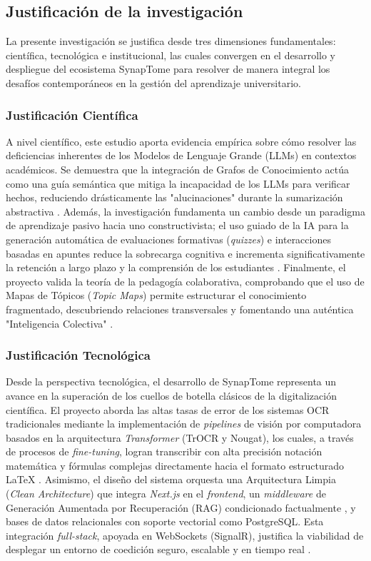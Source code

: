 \subsection{Justificación de la investigación}

La presente investigación se justifica desde tres dimensiones fundamentales: científica, tecnológica e institucional, las cuales convergen en el desarrollo y despliegue del ecosistema SynapTome para resolver de manera integral los desafíos contemporáneos en la gestión del aprendizaje universitario.

\subsubsection{Justificación Científica}
A nivel científico, este estudio aporta evidencia empírica sobre cómo resolver las deficiencias inherentes de los Modelos de Lenguaje Grande (LLMs) en contextos académicos. Se demuestra que la integración de Grafos de Conocimiento actúa como una guía semántica que mitiga la incapacidad de los LLMs para verificar hechos, reduciendo drásticamente las "alucinaciones" durante la sumarización abstractiva \parencite{Chen2023}. Además, la investigación fundamenta un cambio desde un paradigma de aprendizaje pasivo hacia uno constructivista; el uso guiado de la IA para la generación automática de evaluaciones formativas (\textit{quizzes}) e interacciones basadas en apuntes reduce la sobrecarga cognitiva e incrementa significativamente la retención a largo plazo y la comprensión de los estudiantes \parencite{Kreijkes2026, Afian2025}. Finalmente, el proyecto valida la teoría de la pedagogía colaborativa, comprobando que el uso de Mapas de Tópicos (\textit{Topic Maps}) permite estructurar el conocimiento fragmentado, descubriendo relaciones transversales y fomentando una auténtica "Inteligencia Colectiva" \parencite{Obionwu2022}.

\subsubsection{Justificación Tecnológica}
Desde la perspectiva tecnológica, el desarrollo de SynapTome representa un avance en la superación de los cuellos de botella clásicos de la digitalización científica. El proyecto aborda las altas tasas de error de los sistemas OCR tradicionales mediante la implementación de \textit{pipelines} de visión por computadora basados en la arquitectura \textit{Transformer} (TrOCR y Nougat), los cuales, a través de procesos de \textit{fine-tuning}, logran transcribir con alta precisión notación matemática y fórmulas complejas directamente hacia el formato estructurado \LaTeX{} \parencite{AlvarezPerez2026, KardanMoghaddam2025}. Asimismo, el diseño del sistema orquesta una Arquitectura Limpia (\textit{Clean Architecture}) que integra \textit{Next.js} en el \textit{frontend}, un \textit{middleware} de Generación Aumentada por Recuperación (RAG) condicionado factualmente \parencite{Ning2025, Jiang2025}, y bases de datos relacionales con soporte vectorial como PostgreSQL. Esta integración \textit{full-stack}, apoyada en WebSockets (SignalR), justifica la viabilidad de desplegar un entorno de coedición seguro, escalable y en tiempo real \parencite{Shirkande2025, Upadhyay2026}.

